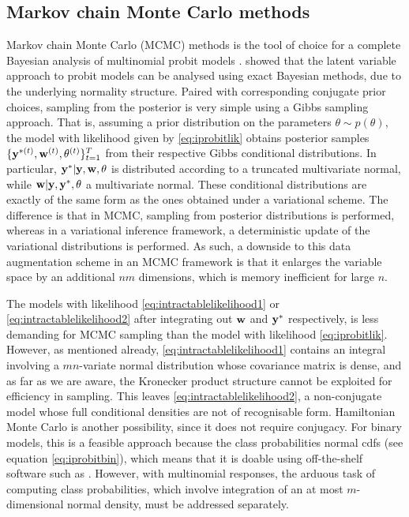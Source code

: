 \subsection{Markov chain Monte Carlo methods}

Markov chain Monte Carlo (MCMC) methods is the tool of choice for a complete Bayesian analysis of multinomial probit models \citep{mcculloch2000bayesian,nobile1998hybrid,mcculloch2000bayesian}.
\citet{albert1993bayesian} showed that the latent variable approach to probit models can be analysed using exact Bayesian methods, due to the underlying normality structure.
Paired with corresponding conjugate prior choices, sampling from the posterior is very simple using a Gibbs sampling approach.
That is, assuming a prior distribution on the parameters $\theta\sim p(\theta)$, the model with likelihood given by \cref{eq:iprobitlik} obtains posterior samples $\{{\mathbf y}^{*(t)}, {\mathbf w}^{(t)},\theta^{(t)} \}_{t=1}^T$ from their respective Gibbs conditional distributions.
In particular, ${\mathbf y}^{*}|{\mathbf y},{\mathbf w},\theta$ is distributed according to a truncated multivariate normal, while ${\mathbf w}|{\mathbf y},{\mathbf y}^*,\theta$ a multivariate normal.
These conditional distributions are exactly of the same form as the ones obtained under a variational scheme.
The difference is that in MCMC, sampling from posterior distributions is performed, whereas in a variational inference framework, a deterministic update of the variational distributions is performed.
As such, a downside to this data augmentation scheme in an MCMC framework is that it enlarges the variable space by an additional $nm$ dimensions, which is memory inefficient for large $n$.

The models with likelihood \cref{eq:intractablelikelihood1} or \cref{eq:intractablelikelihood2} after integrating out ${\mathbf w}$ and ${\mathbf y}^*$ respectively, is less demanding for MCMC sampling than the model with likelihood \cref{eq:iprobitlik}.
However, as mentioned already, \cref{eq:intractablelikelihood1} contains an integral involving a $mn$-variate normal distribution whose covariance matrix is dense, and as far as we are aware, the Kronecker product structure cannot be exploited for efficiency in sampling.
This leaves \cref{eq:intractablelikelihood2}, a non-conjugate model whose full conditional densities are not of recognisable form.
Hamiltonian Monte Carlo is another possibility, since it does not require conjugacy.
For binary models, this is a feasible approach because the class probabilities normal cdfs (see equation \ref{eq:iprobitbin}), which means that it is doable using off-the-shelf software such as .
However, with multinomial responses, the arduous task of computing class probabilities, which involve integration of an at most $m$-dimensional normal density, must be addressed separately.

